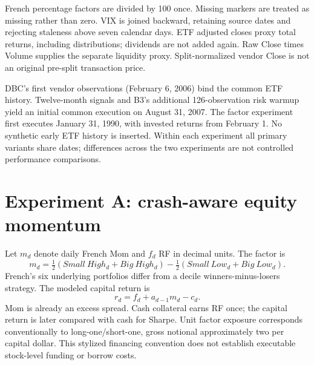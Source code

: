 \documentclass[11pt]{article}
\begin{document}
French percentage factors are divided by 100 once. Missing markers are treated as missing rather than zero. VIX is joined backward, retaining source dates and rejecting staleness above seven calendar days. ETF adjusted closes proxy total returns, including distributions; dividends are not added again. Raw Close times Volume supplies the separate liquidity proxy. Split-normalized vendor Close is not an original pre-split transaction price.

DBC's first vendor observations (February 6, 2006) bind the common ETF history. Twelve-month signals and B3's additional 126-observation risk warmup yield an initial common execution on August 31, 2007. The factor experiment first executes January 31, 1990, with invested returns from February 1. No synthetic early ETF history is inserted. Within each experiment all primary variants share dates; differences across the two experiments are not controlled performance comparisons.
\clearpage
\section{Experiment A: crash-aware equity momentum}
Let $m_d$ denote daily French Mom and $f_d$ RF in decimal units. The factor is
\begin{equation}
m_d=\tfrac12(Small\ High_d+Big\ High_d)-\tfrac12(Small\ Low_d+Big\ Low_d).
\end{equation}
French's six underlying portfolios differ from a decile winners-minus-losers strategy. The modeled capital return is
\begin{equation}r_d=f_d+a_{d-1}m_d-c_d.\end{equation}
Mom is already an excess spread. Cash collateral earns RF once; the capital return is later compared with cash for Sharpe. Unit factor exposure corresponds conventionally to long-one/short-one, gross notional approximately two per capital dollar. This stylized financing convention does not establish executable stock-level funding or borrow costs.
\end{document}
